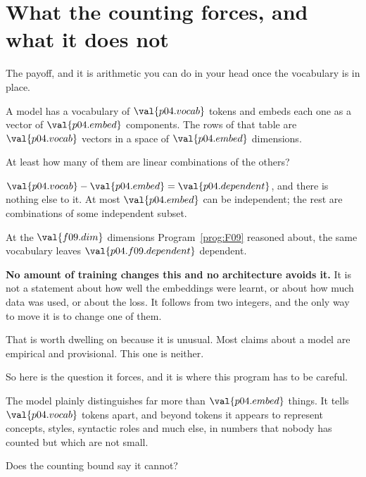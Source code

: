 \section{What the counting forces, and what it does not}
\label{sec:P04-counting}

\begin{fr}
The payoff, and it is arithmetic you can do in your head once the vocabulary is
in place.

A model has a vocabulary of $\val{p04.vocab}$ tokens and embeds each one as a
vector of $\val{p04.embed}$ components. The rows of that table are
$\val{p04.vocab}$ vectors in a space of $\val{p04.embed}$ dimensions.

At least how many of them are linear combinations of the others?
\nextframe
\end{fr}

\begin{fr}
$\val{p04.vocab} - \val{p04.embed} = \val{p04.dependent}$, and there is nothing
else to it. At most $\val{p04.embed}$ can be independent; the rest are
combinations of some independent subset.

At the $\val{f09.dim}$ dimensions Program~\ref{prog:F09} reasoned about, the
same vocabulary leaves $\val{p04.f09.dependent}$ dependent.

\begin{warning}
\textbf{No amount of training changes this and no architecture avoids it.} It
is not a statement about how well the embeddings were learnt, or about how much
data was used, or about the loss. It follows from two integers, and the only
way to move it is to change one of them.

That is worth dwelling on because it is unusual. Most claims about a model are
empirical and provisional. This one is neither.
\end{warning}
\end{fr}

\begin{fr}
So here is the question it forces, and it is where this program has to be
careful.

The model plainly distinguishes far more than $\val{p04.embed}$ things. It
tells $\val{p04.vocab}$ tokens apart, and beyond tokens it appears to represent
concepts, styles, syntactic roles and much else, in numbers that nobody has
counted but which are not small.

Does the counting bound say it cannot?
\nextframe
\end{fr}

